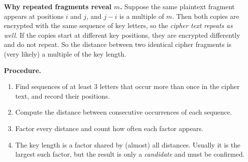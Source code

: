 \documentclass[a4paper, 10pt]{article}
\begin{document}
\begin{problem}
\begin{subproblems_alpha}
\begin{solution}
		      \textbf{Why repeated fragments reveal $m$.}
		      Suppose the same plaintext fragment appears at positions $i$ and $j$, and $j - i$ is a multiple of $m$.
		      Then both copies are encrypted with the same sequence of key letters, so the \emph{cipher text repeats as well}.
		      If the copies start at different key positions, they are encrypted differently and do not repeat.
		      So the distance between two identical cipher fragments is (very likely) a multiple of the key length.

		      \textbf{Procedure.}
		      \begin{enumerate}[label=\arabic*.]
			      \item Find sequences of at least 3 letters that occur more than once in the cipher text, and record their positions.
			      \item Compute the distance between consecutive occurrences of each sequence.
			      \item Factor every distance and count how often each factor appears.
			      \item The key length is a factor shared by (almost) all distances. Usually it is the largest such factor, but the result is only a \emph{candidate} and must be confirmed.
		      \end{enumerate}


\end{solution}
\end{subproblems_alpha}
\end{problem}
\end{document}
